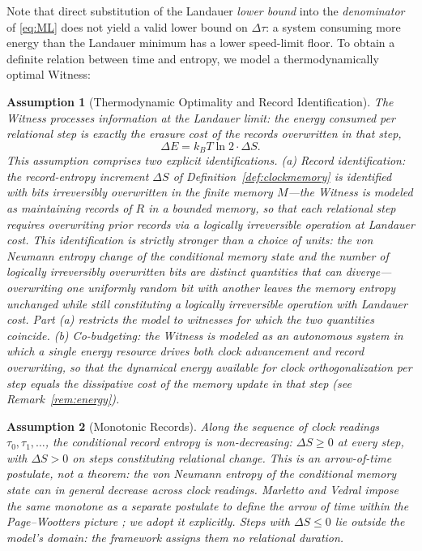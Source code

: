 \documentclass[11pt, a4paper]{article}
\newtheorem{assumption}{Assumption}
\begin{document}
Note that direct substitution of the Landauer \emph{lower bound} into the \emph{denominator} of \eqref{eq:ML} does not yield a valid lower bound on $\Delta\tau$: a system consuming more energy than the Landauer minimum has a lower speed-limit floor. To obtain a definite relation between time and entropy, we model a thermodynamically optimal Witness:

\begin{assumption}[Thermodynamic Optimality and Record Identification]
\label{ass:opt}
The Witness processes information at the Landauer limit: the energy consumed per relational step is exactly the erasure cost of the records overwritten in that step,
\begin{equation}
\Delta E = k_B T \ln 2 \cdot \Delta S.
\label{eq:optimal}
\end{equation}
This assumption comprises two explicit identifications. \emph{(a) Record identification:} the record-entropy increment $\Delta S$ of Definition~\ref{def:clockmemory} is identified with bits irreversibly overwritten in the finite memory $M$---the Witness is modeled as maintaining records of $R$ in a bounded memory, so that each relational step requires overwriting prior records via a logically irreversible operation at Landauer cost. This identification is strictly stronger than a choice of units: the von Neumann entropy change of the conditional memory state and the number of logically irreversibly overwritten bits are distinct quantities that can diverge---overwriting one uniformly random bit with another leaves the memory entropy unchanged while still constituting a logically irreversible operation with Landauer cost. Part (a) restricts the model to witnesses for which the two quantities coincide. \emph{(b) Co-budgeting:} the Witness is modeled as an autonomous system in which a single energy resource drives both clock advancement and record overwriting, so that the dynamical energy available for clock orthogonalization per step equals the dissipative cost of the memory update in that step (see Remark~\ref{rem:energy}).
\end{assumption}

\begin{assumption}[Monotonic Records]
\label{ass:mono}
Along the sequence of clock readings $\tau_0, \tau_1, \ldots$, the conditional record entropy is non-decreasing: $\Delta S \geq 0$ at every step, with $\Delta S > 0$ on steps constituting relational change. This is an arrow-of-time postulate, not a theorem: the von Neumann entropy of the conditional memory state can in general decrease across clock readings. Marletto and Vedral impose the same monotone as a separate postulate to define the arrow of time within the Page--Wootters picture \cite{Marletto2017}; we adopt it explicitly. Steps with $\Delta S \leq 0$ lie outside the model's domain: the framework assigns them no relational duration.
\end{assumption}
\end{document}
